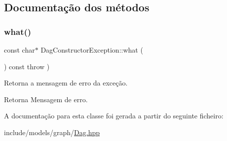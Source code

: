\subsection{Documentação dos métodos}
\mbox{\label{classDagConstructorException_a3ad88177747ce6ef7273d1196258c7ba}} 
\subsubsection{\texorpdfstring{what()}{what()}}
{\footnotesize\ttfamily const char$\ast$ Dag\+Constructor\+Exception\+::what (\begin{DoxyParamCaption}{ }\end{DoxyParamCaption}) const throw  ) \hspace{0.3cm}{\ttfamily [inline]}}

Retorna a mensagem de erro da exceção. \begin{DoxyReturn}{Retorna}
Mensagem de erro. 
\end{DoxyReturn}


A documentação para esta classe foi gerada a partir do seguinte ficheiro\+:\begin{DoxyCompactItemize}
\item 
include/models/graph/\hyperlink{Dag_8hpp}{Dag.\+hpp}\end{DoxyCompactItemize}
